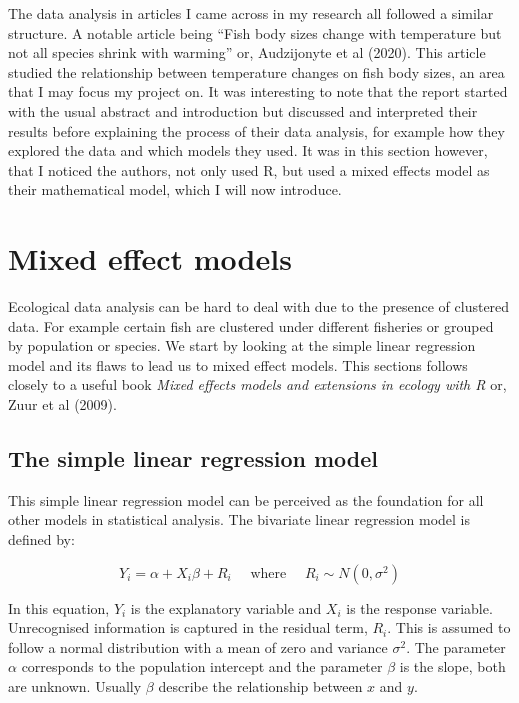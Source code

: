\documentclass{article}
\begin{document}
The data analysis in articles I came across in my research all followed a similar structure. A notable article being “Fish body sizes change with temperature but not all species shrink with warming” \cite{7} or, Audzijonyte et al (2020). This article studied the relationship between temperature changes on fish body sizes, an area that I may focus my project on. It was interesting to note that the report started with the usual abstract and introduction but discussed and interpreted their results before explaining the process of their data analysis, for example how they explored the data and which models they used. It was in this section however, that I noticed the authors, not only used R, but used a mixed effects model as their mathematical model, which I will now introduce.

\section{Mixed effect models}

Ecological data analysis can be hard to deal with due to the presence of clustered data. For example certain fish are clustered under different fisheries or grouped by population or species. We start by looking at the simple linear regression model and its flaws to lead us to mixed effect models. This sections follows closely to a useful book \textit{Mixed effects models and extensions in ecology with R} \cite{13} or, Zuur et al (2009).

\subsection{The simple linear regression model}

This simple linear regression model can be perceived as the foundation for all other models in statistical analysis. The bivariate linear regression model is defined by:

\[
Y_i = \alpha + X_i \beta + R_i 
\quad \mbox{ where } \quad
R_i \sim N(0, \sigma^2)
\]

In this equation, $Y_i$ is the explanatory variable and $X_i$ is the response variable. Unrecognised information is captured in the residual term, $R_i$. This is assumed to follow a normal distribution with a mean of zero and variance $\sigma^2$. The parameter $\alpha$ corresponds to the population intercept and the parameter $\beta$ is the slope, both are unknown. Usually $\beta$ describe the relationship between $x$ and $y$.
\end{document}
